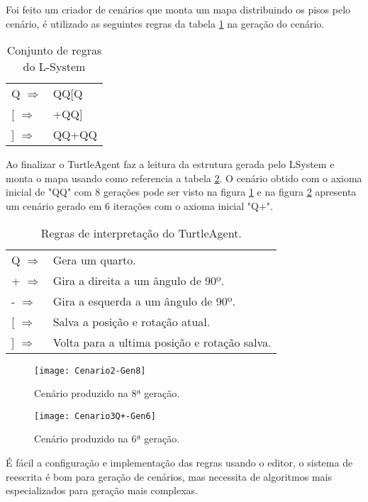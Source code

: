\label{cenarioSection}
Foi feito um criador de cenários que monta um mapa distribuindo os pisos pelo cenário, é utilizado as seguintes regras da tabela \ref{cenárioRules} na geração do cenário.

\begin{table}[]
	\centering
	\begin{tabular}{ll}
		Q $\Rightarrow$   & QQ{[}Q \\ 
		{[} $\Rightarrow$ & +QQ{]} \\ 
		{]} $\Rightarrow$ & QQ+QQ  \\ 
	\end{tabular}
	\caption{Conjunto de regras do L-System}
	\label{cenárioRules}
\end{table}

Ao finalizar o TurtleAgent faz a leitura da estrutura gerada pelo LSystem e monta o mapa usando como referencia a tabela \ref{cenárioTurtle}. O cenário obtido com o axioma inicial de "QQ" com 8 gerações pode ser visto na figura \ref{cenário8Gen} e na figura \ref{cenário9Gen} apresenta um cenário gerado em 6 iterações com o axioma inicial "Q+".
\begin{table}[]
	\centering
	\begin{tabular}{ll}
		Q $\Rightarrow$   & Gera um quarto.                              \\
		+  $\Rightarrow$  & Gira a direita a um ângulo de 90º.            \\
		-  $\Rightarrow$  & Gira a esquerda a um ângulo de 90º.           \\
		{[}  $\Rightarrow$ & Salva a posição e rotação atual.             \\
		{]}  $\Rightarrow$ & Volta para a ultima posição e rotação salva.
	\end{tabular}
	\caption{Regras de interpretação do TurtleAgent.}
	\label{cenárioTurtle}
\end{table}

\begin{figure}[!h]
	\centering
	\texttt{[image: Cenario2-Gen8]}
	\caption{Cenário produzido na 8ª geração.}
	\label{cenário8Gen}
\end{figure}

\begin{figure}[!h]
	\centering
	\texttt{[image: Cenario3Q+-Gen6]}
	\caption{Cenário produzido na 6ª geração.}
	\label{cenário9Gen}
\end{figure}

É fácil a configuração e implementação das regras usando o editor, o sistema de reescrita é bom para geração de cenários, mas necessita de algoritmos mais especializados para geração mais complexas.


